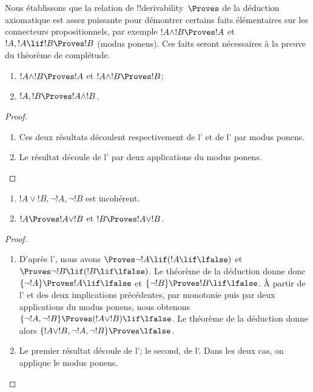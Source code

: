 \documentclass[../../../include/open-logic-section]{subfiles}
\begin{document}
      {}
      {}


\begin{explain}
Nous établissons que la relation de !!{derivability}~$\Proves$ de la
déduction axiomatique est assez puissante pour démontrer certains faits
élémentaires sur les connecteurs propositionnels, par exemple
$!A \land !B \Proves !A$ et
$!A, !A \lif !B \Proves !B$ (modus ponens). Ces faits seront
nécessaires à la preuve du théorème de complétude.
\end{explain}

\begin{prop}
\begin{enumerate}
\item {}
  $!A \land !B \Proves !A$ et $!A \land !B \Proves !B$;
\item {}
  $!A, !B \Proves !A \land !B$.
\end{enumerate}
\end{prop}

\begin{proof}
\begin{enumerate}
\item Ces deux résultats découlent respectivement de
  l' et de l' par modus ponens.
\item Le résultat découle de l' par deux
  applications du modus ponens.
\end{enumerate}
\end{proof}

\begin{prop}
\begin{enumerate}
\item $!A \lor !B, \lnot !A, \lnot !B$ est incohérent.
\item $!A \Proves !A \lor !B$ et $!B \Proves !A \lor !B$.
\end{enumerate}
\end{prop}

\begin{proof}
\begin{enumerate}
\item D'après l', nous avons
  $\Proves \lnot !A \lif (!A \lif \lfalse)$ et
  $\Proves \lnot !B \lif (!B \lif \lfalse)$. Le théorème de la
  déduction donne donc
  $\{\lnot !A\} \Proves !A \lif \lfalse$ et
  $\{\lnot !B\} \Proves !B \lif \lfalse$. À partir de
  l' et des deux implications précédentes, par
  monotonie puis par deux applications du modus ponens, nous obtenons
  $\{\lnot !A, \lnot !B\} \Proves (!A \lor !B) \lif \lfalse$.
  Le théorème de la déduction donne alors
  $\{!A \lor !B, \lnot !A, \lnot !B\} \Proves \lfalse$.
\item Le premier résultat découle de l'; le second,
  de l'. Dans les deux cas, on applique le modus
  ponens.
\end{enumerate}
\end{proof}
\end{document}
